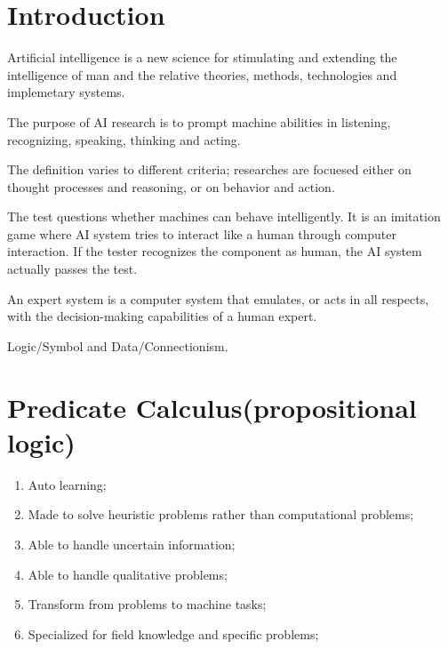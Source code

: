 \documentclass{article}
\begin{document}
	\maketitle
	\pagestyle{fancy}
	\thispagestyle{empty}

	\part{Introduction}
	

	\answer

	Artificial intelligence is a new science for stimulating and extending the intelligence of man and the relative theories, methods, technologies and implemetary systems.

	The purpose of AI research is to prompt machine abilities in listening, recognizing, speaking, thinking and acting. 

	The definition varies to different criteria; researches are focuesed either on thought processes and reasoning, or on behavior and action. 


	\answer

	The test questions whether machines can behave intelligently. It is an imitation game where AI system tries to interact like a human through computer interaction. If the tester recognizes the component as human, the AI system actually passes the test.


	\answer

	An expert system is a computer system that emulates, or acts in all respects, with the decision-making capabilities of a human expert.


	Logic/Symbol and Data/Connectionism.

	\part{Predicate Calculus(propositional logic)}


	\answer

	\begin{enumerate}
		\item Auto learning;
		\item Made to solve heuristic problems rather than computational problems;
		\item Able to handle uncertain information;
		\item Able to handle qualitative problems;
		\item Transform from problems to machine tasks;
		\item Specialized for field knowledge and specific problems;
	\end{enumerate}
\end{document}
